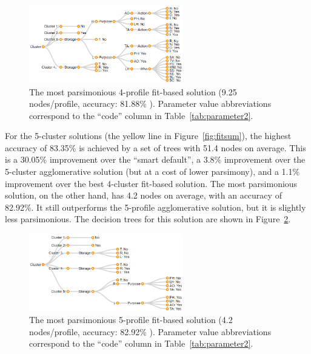 \begin{figure}
	\centering
	\includegraphics[width=0.6\textwidth]{figures/fit_4_profile010.png}
	\caption{The most parsimonious 4-profile fit-based solution (9.25 nodes/profile, accuracy: 81.88\% ). Parameter value abbreviations correspond to the ``code'' column in Table~\ref{tab:parameter2}.}
	\label{fig:fit_4_profile010}
	\vspace{20px}
\end{figure}

For the 5-cluster solutions (the yellow line in Figure~\ref{fig:fitsum}), the highest accuracy of 83.35\% is achieved by a set of trees with 51.4 nodes on average. This is a 30.05\% improvement over the ``smart default'', a 3.8\% improvement over the 5-cluster agglomerative solution (but at a cost of lower parsimony), and a 1.1\% improvement over the best 4-cluster fit-based solution. The most parsimonious solution, on the other hand, has 4.2 nodes on average, with an accuracy of 82.92\%. It still outperforms the 5-profile agglomerative solution, but it is slightly less parsimonious. The decision trees for this solution are shown in Figure~\ref{fig:fit_5_profile001}.

\begin{figure}
	\centering
	\includegraphics[width=0.6\textwidth]{figures/fit_5_profile001.png}
	\caption{The most parsimonious 5-profile fit-based solution (4.2 nodes/profile, accuracy: 82.92\% ). Parameter value abbreviations correspond to the ``code'' column in Table~\ref{tab:parameter2}.}
	\label{fig:fit_5_profile001}
\end{figure}

